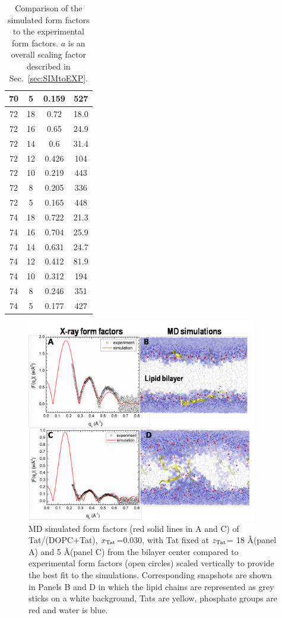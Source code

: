 \begin{table}[htbp]
\begin{tabular}{c c c c}
    70 & 5  & 0.159	& 527 \\
    \hline
    72 & 18 & 0.72  & 18.0 \\
    72 & 16 & 0.65  & 24.9 \\
    72 & 14 & 0.6   & 31.4 \\
    72 & 12 & 0.426	& 104 \\
    72 & 10 & 0.219 & 443 \\
    72 & 8  & 0.205 & 336 \\
    72 & 5  & 0.165 & 448 \\
    \hline
    74 & 18 & 0.722 & 21.3 \\
    74 & 16 & 0.704	& 25.9 \\
    74 & 14 & 0.631 & 24.7 \\
    74 & 12 & 0.412 & 81.9 \\
    74 & 10 & 0.312 & 194 \\
    74 & 8  & 0.246 & 351 \\
    74 & 5  & 0.177 & 427 \\
    \hline
  \end{tabular}
  \caption{Comparison of the simulated form factors to the 
  experimental form factors. $a$ is an overall scaling factor described in
  Sec.~\ref{sec:SIMtoEXP}.}
  \label{tab:MD_sim-exp}
\end{table}

\begin{figure}[htbp]
  \centering
  \includegraphics[width=0.9\textwidth]{figures/Tat/figure4}
  \caption{MD simulated form factors (red solid lines in A and C) of Tat/(DOPC+Tat), $x_\textrm{Tat}$=0.030,
  with Tat fixed at $z_\textrm{Tat}$= 18 \AA (panel A) and 5 \AA (panel C) from the bilayer center compared to
  experimental form factors (open circles) scaled vertically to provide the best fit to the
  simulations. Corresponding snapshots are shown in Panels B and D in which the lipid chains are
  represented as grey sticks on a white background, Tats are yellow, phosphate groups are red and
  water is blue.}
  \label{fig:figure4}
\end{figure}

